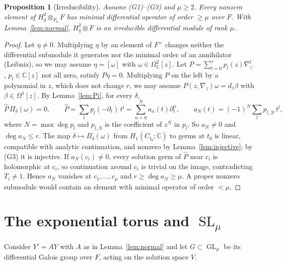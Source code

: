 \documentclass[11pt]{article}
\numberwithin{equation}{section}
\newtheorem{proposition}[proposition]{Proposition}
\theoremstyle{definition}
\theoremstyle{remark}
\newcommand{\C}{\mathbb C}
\newcommand{\SL}{\operatorname{SL}}
\newcommand{\GL}{\operatorname{GL}}
\newcommand{\Hq}{H_q^2}
\begin{document}
\begin{proposition}[Irreducibility]\label{prop:irred}
Assume \textup{(G1)--(G3)} and $\mu\ge2$. Every nonzero element of
$\Hq\otimes_{F_0}F$ has minimal differential operator of order $\ge\mu$ over
$F$. With Lemma~\ref{lem:normal}, $\Hq\otimes F$ is an irreducible differential
module of rank $\mu$.
\end{proposition}
\begin{proof}
Let $\eta\ne0$. Multiplying $\eta$ by an element of $F^\times$ changes neither
the differential submodule it generates nor the minimal order of an
annihilator (Leibniz), so we may assume $\eta=[\omega]$ with
$\omega\in\Omega^2_\C[z]$. Let
$P=\sum_{l=0}^rp_l(z)\nabla_z^l$, $p_l\in\C[z]$ not all zero, satisfy
$P\eta=0$. Multiplying $P$ on the left by a polynomial in $z$, which does not change $r$,
we may assume $P(z,\nabla_z)\omega=d_z\beta$ with $\beta\in\Omega^1[z]$. By
Lemma~\ref{lem:Pi}, for every $\delta$,
\[
 \widehat P\,\Pi_\delta(\omega)=0,\qquad
 \widehat P=\sum_lp_l(-\partial_t)\,t^l=\sum_{n=0}^Na_n(t)\partial_t^n,
 \qquad a_N(t)=(-1)^N\sum_l p_{l,N}\,t^l,
\]
where $N=\max\deg p_l$ and $p_{l,N}$ is the coefficient of $z^N$ in $p_l$. So
$a_N\ne0$ and $\deg a_N\le r$.
The map $\delta\mapsto\Pi_\delta(\omega)$ from $H_1(C_{t_0};\C)$ to germs at $t_0$
is linear, compatible with analytic continuation, and nonzero by
Lemma~\ref{lem:injective}; by (G3) it is injective. If $a_N(c_i)\ne0$, every
solution germ of $\widehat P$ near $c_i$ is holomorphic at $c_i$, so
continuation around $c_i$ is trivial on the image, contradicting $T_i\ne1$.
Hence $a_N$ vanishes at $c_1,\dots,c_\mu$ and $r\ge\deg a_N\ge\mu$. A proper
nonzero submodule would contain an element with minimal operator of order
$<\mu$.
\end{proof}

\section{The exponential torus and \texorpdfstring{$\SL_\mu$}{SL}}

Consider $Y'=AY$ with $A$ as in Lemma~\ref{lem:normal} and let $G\subset\GL_\mu$
be its differential Galois group over $F$, acting on the solution space $V$.
\end{document}
